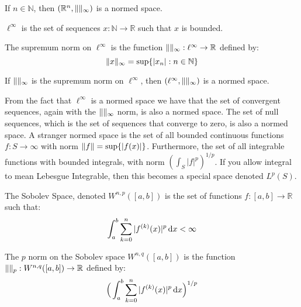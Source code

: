         \begin{theorem}
            If $n\in\mathbb{N}$, then
            $(\mathbb{R}^{n},\lVert\rVert_{\infty})$ is a
            normed space.
        \end{theorem}
        \begin{definition}
            $\ell^{\infty}$ is the set of sequences
            $x:\mathbb{N}\rightarrow\mathbb{R}$ such that
            $x$ is bounded.
        \end{definition}
        \begin{definition}
            The supremum norm on $\ell^{\infty}$
            is the function
            $\norm{}_{\infty}:%
             \ell^{\infty}\rightarrow\mathbb{R}$
            defined by:
            \begin{equation*}
                \lVert x\rVert_{\infty}
                =\sup\{|x_{n}|:n\in\mathbb{N}\}
            \end{equation*}
        \end{definition}
        \begin{theorem}
            If $\lVert\rVert_{\infty}$ is the
            supremum norm on $\ell^{\infty}$, then
            $(\ell^{\infty},\lVert\rVert_{\infty})$
            is a normed space.
        \end{theorem}
        From the fact that $\ell^{\infty}$ is a normed space
        we have that the set of convergent sequences,
        again with the $\lVert\rVert_{\infty}$ norm, is also
        a normed space. The set of null sequences, which
        is the set of sequences that converge to zero,
        is also a normed space.
        A stranger normed space
        is the set of all bounded continuous functions
        $f:S\rightarrow\infty$ with norm
        $\lVert f\rVert=\sup\{|f(x)|\}$. Furthermore, the
        set of all integrable functions with
        bounded integrals, with norm
        $(\int_{S}|f|^{p})^{1/p}$. If you allow integral
        to mean Lebesgue Integrable, then this becomes
        a special space denoted $L^{p}(S)$.
        \begin{definition}
            The Sobolev Space, denoted $W^{n,p}([a,b])$
            is the set of functions
            $f:[a,b]\rightarrow\mathbb{R}$ such that:
            \begin{equation*}
                \int_{a}^{b}\sum_{k=0}^{n}
                |f^{(k)}(x)|^{p}\mathop{}\!\mathrm{d}{x}<\infty
            \end{equation*}
        \end{definition}
        \begin{definition}
            The $p$ norm on the Sobolev space
            $W^{n,q}([a,b])$ is the function
            $\lVert\rVert_{p}:W^{n,q}([a,b])\rightarrow\mathbb{R}$
            defined by:
            \begin{equation*}
                \Big(\int_{a}^{b}\sum_{k=0}^{n}
                |f^{(k)}(x)|^{p}\mathop{}\!\mathrm{d}{x}\Big)^{1/p}
            \end{equation*}
        \end{definition}
